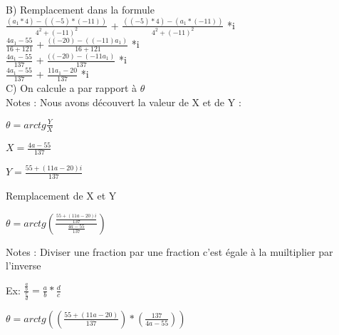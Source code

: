 \vspace{5mm} %

B) Remplacement dans la formule \\

$\frac{(a_1 * 4) - ((-5)*(-11))} {4^{2}+(-11)^{2} } $ + $\frac{( (-5) * 4) - (a_1*(-11))} {4^{2}+(-11)^{2} } $ *i \\

$\frac{4a_1 -55} {16+121} $ + $\frac{( (-20) - ((-11)a_1)} {16+121} $ *i \\

$\frac{4a_1 -55} {137} $ + $\frac{( (-20) - (-11a_1)} {137} $ *i \\

$\frac{4a_1 -55} {137} $ + $\frac{11a_1-20} {137} $ *i \\

\vspace{8mm} %
C) On calcule a par rapport à $\theta$ \\

Notes : Nous avons découvert la valeur de X et de Y : \\
\vspace{3mm} %

$
\theta = arctg{\frac{Y}{X}}
$
\vspace{5mm} %

$
X = \frac{4a-55}{137}
$
\vspace{5mm} %

$
Y= \frac{55+(11a-20)i}{137}
$
\vspace{5mm} %

Remplacement de X et Y
\vspace{5mm} %

$
\theta = arctg(\frac{\frac{55+(11a-20)i}{137}} {\frac{4a-55}{137}})
$
\vspace{5mm} %

Notes : Diviser une fraction par une fraction c'est égale à la muiltiplier par l'inverse
\vspace{5mm} %

Ex:
$
\frac{\frac{a}{b}}{\frac{c}{d}} = \frac{a}{b} * \frac{d}{c}
$
\vspace{5mm} %

$
\theta = arctg((\frac{55+(11a-20)}{137}) * (\frac{137}{4a-55}))
$
\vspace{5mm} %

